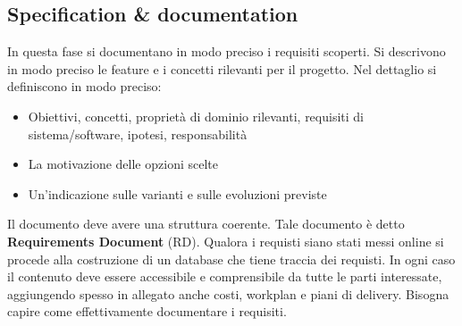 \subsection{Specification \& documentation}
In questa fase si documentano in modo preciso i requisiti scoperti. Si descrivono in modo preciso le feature e i concetti rilevanti per il progetto. Nel dettaglio si definiscono in modo preciso:
\begin{itemize}
    \item Obiettivi, concetti, proprietà di dominio rilevanti, requisiti di sistema/software, ipotesi, responsabilità
    \item La motivazione delle opzioni scelte
    \item Un'indicazione sulle varianti e sulle evoluzioni previste
\end{itemize}

Il documento deve avere una struttura coerente. Tale documento è detto \textbf{Requirements Document} (RD). Qualora i requisti siano stati messi online si procede alla costruzione di un database che tiene traccia dei requisti. In ogni caso il contenuto deve essere accessibile e comprensibile da tutte le parti interessate, aggiungendo spesso in allegato anche costi, workplan e piani di delivery. Bisogna capire come effettivamente documentare i requisiti. 

